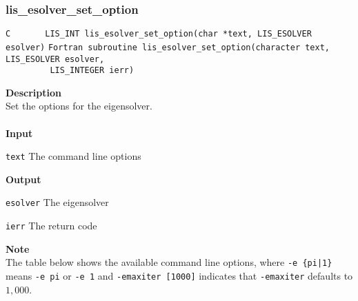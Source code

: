 \documentclass[a4paper]{article}
\newcommand{\namelistlabel}[1]{\mbox{#1}\hfill}
\newenvironment{namelist}[1]{%
\begin{list}{}
  {\let\makelabel\namelistlabel
  \settowidth{\labelwidth}{#1}
  \setlength{\leftmargin}{1.1\labelwidth}}
  }{%
\end{list}}
\begin{document}
\newpage
\subsubsection{lis\_esolver\_set\_option}
  \label{sec:setoptions}
\begin{screen}
\verb|C       LIS_INT lis_esolver_set_option(char *text, LIS_ESOLVER esolver)|
\verb|Fortran subroutine lis_esolver_set_option(character text, LIS_ESOLVER esolver,|\\
\verb|         LIS_INTEGER ierr)|
\end{screen}
{\bf Description}\\
\indent
Set the options for the eigensolver.
\\ \\
\noindent
{\bf Input}
\begin{namelist}{XXXXXXXXXXXXXXXXXXXX}
\item[\tt text] The command line options
\end{namelist}
{\bf Output}
\begin{namelist}{XXXXXXXXXXXXXXXXXXXX}
\item[\tt esolver] The eigensolver
\item[\tt ierr] The return code
\end{namelist}
{\bf Note}\\
\indent
The table below shows the available command line options, 
where \verb=-e {pi|1}= means \verb=-e pi= or \verb=-e 1= and \verb=-emaxiter [1000]= indicates 
that \verb=-emaxiter= defaults to $1,000$.
\\
\\
\end{document}
